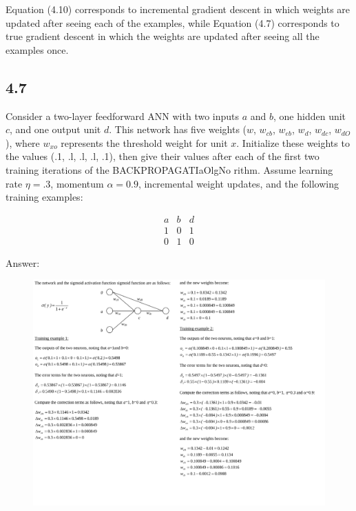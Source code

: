 Equation (4.10) corresponds to incremental gradient descent in which weights 
are updated after seeing each of the examples, while Equation (4.7) corresponds 
to true gradient descent in which the weights are updated after seeing all the 
examples once.

\subsection*{4.7}

Consider a two-layer feedforward ANN with two inputs $a$ and $b$, one hidden unit $c$, and one output unit $d$. This network has five weights ($w$, $w_{cb}$, $w_{eb}$, $w_{d}$, $w_{dc}$, $w_{dO}$), where $w_{xo}$ represents the threshold weight for unit $x$. Initialize these weights to the values (.1, .l, .l, .l, .1), then give their values after each of the first two training iterations of the BACKPROPAGATIaOlgNo rithm. Assume learning rate $\eta=.3$, momentum $\alpha=0.9$, incremental weight updates, and the following training examples:

\begin{equation}
\begin{matrix}
    a&b&d\\
    1&0&1\\
    0&1&0   \nonumber
\end{matrix}
\end{equation}

Answer:

\begin{figure}[H]
    \centering
    \includegraphics[width=1\textwidth]{./2023April/solution4_7.pdf}
    \caption{}
    \label{solution4_7}
\end{figure}
